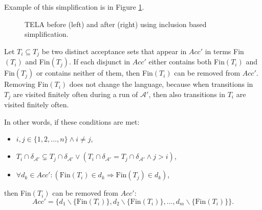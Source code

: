 \documentclass[
  digital, %
  twoside, %
  table,   %
  lof,     %
  lot,     %
]{fithesis3}
\begin{document}
Example of this simplification is in Figure \ref{fig:inclusion_infs}.

\begin{figure}[h]
  \centering
  \caption{TELA before (left) and after (right) using inclusion based simplification.}
  \label{fig:inclusion_infs}
\end{figure}

Let $T_i \subseteq T_j$ be two distinct acceptance sets that appear in $Acc'$ in terms Fin$(T_i)$ and Fin$(T_j)$. If each disjunct in $Acc'$ either contains both Fin$(T_i)$ and Fin$(T_j)$ or contains neither of them, then Fin$(T_i)$ can be removed from $Acc'$.  Removing Fin$(T_i)$ does not change the language, because when transitions in $T_j$ are visited finitely often during a run of $\mathcal{A'}$, then also transitions in $T_i$ are visited finitely often. 

In other words, if these conditions are met:
\begin{itemize}
  \item $i, j \in \{1,2, \dots, n\} \wedge i \neq j$,
  \item $T_i \cap \delta_{\mathcal{A'}} \subsetneq T_j \cap \delta_{\mathcal{A'}} \vee (T_i \cap \delta_{\mathcal{A'}} = T_j \cap \delta_{\mathcal{A'}} \wedge j > i)$,
  \item $\forall d_k \in Acc' \colon (\text{Fin}(T_i) \in d_k \Rightarrow \text{Fin}(T_j) \in d_k)$,
\end{itemize}
then Fin$(T_i)$ can be removed from $Acc'$:
\begin{equation*}
  Acc' = \{d_1 \smallsetminus \{\text{Fin}(T_i)\}, d_2 \smallsetminus \{\text{Fin}(T_i)\}, \dots, d_m \smallsetminus \{\text{Fin}(T_i)\}\}.
\end{equation*}
\end{document}
